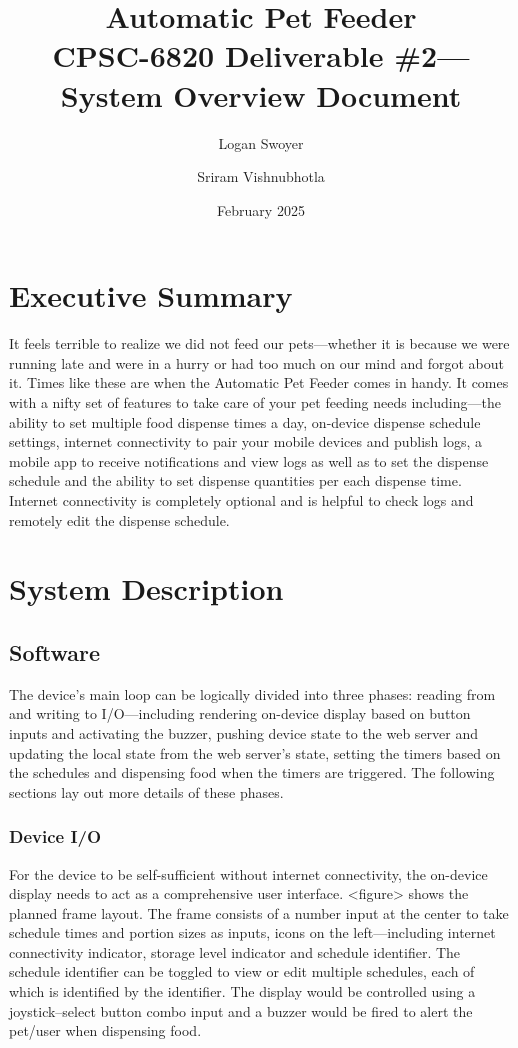 \documentclass{article}
\title{Automatic Pet Feeder\\
\large CPSC-6820 Deliverable \#2---System Overview Document}
\author{Logan Swoyer \and Sriram Vishnubhotla}
\date{February 2025}
\begin{document}
\maketitle

\section{Executive Summary}
It feels terrible to realize we did not feed our pets---whether it is because we were running late and were in a hurry or had too much on our mind and forgot about it. Times like these are when the Automatic Pet Feeder comes in handy. It comes with a nifty set of features to take care of your pet feeding needs including---the ability to set multiple food dispense times a day, on-device dispense schedule settings, internet connectivity to pair your mobile devices and publish logs, a mobile app to receive notifications and view logs as well as to set the dispense schedule and the ability to set dispense quantities per each dispense time. Internet connectivity is completely optional and is helpful to check logs and remotely edit the dispense schedule.

\section{System Description}
\subsection{Software}
The device's main loop can be logically divided into three phases: reading from and writing to I/O---including rendering on-device display based on button inputs and activating the buzzer, pushing device state to the web server and updating the local state from the web server's state, setting the timers based on the schedules and dispensing food when the timers are triggered. The following sections lay out more details of these phases.
\subsubsection{Device I/O}
For the device to be self-sufficient without internet connectivity, the on-device display needs to act as a comprehensive user interface. <figure> shows the planned frame layout. The frame consists of a number input at the center to take schedule times and portion sizes as inputs, icons on the left---including internet connectivity indicator, storage level indicator and schedule identifier. The schedule identifier can be toggled to view or edit multiple schedules, each of which is identified by the identifier. The display would be controlled using a joystick--select button combo input and a buzzer would be fired to alert the pet/user when dispensing food.
\end{document}
